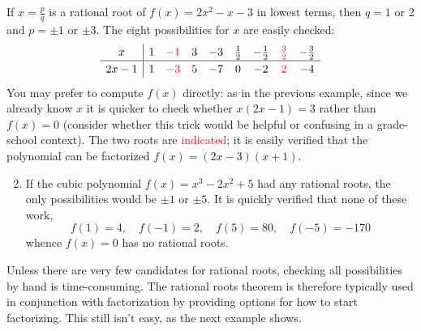 \begin{examples}{}{}
	\exstart If $x=\frac pq$ is a rational root of $f(x)=2x^2-x-3$ in lowest terms, then $q=1$ or 2 and $p=\pm 1$ or $\pm 3$. The eight possibilities for $x$ are easily checked:
	\[
		\def\arraystretch{1.2}
		\begin{array}{c|cccccccc}
			x&1&\textcolor{red}{-1}&3&-3&\frac 12&-\frac 12&\textcolor{red}{\frac 32}&-\frac 32\\\hline
			2x-1&1&\textcolor{red}{-3}&5&-7&0&-2&\textcolor{red}{2}&-4
		\end{array}
	\]
	You may prefer to compute $f(x)$ directly: as in the previous example, since we already know $x$ it is quicker to check whether $x(2x-1)=3$ rather than $f(x)=0$ (consider whether this trick would be helpful or confusing in a grade-school context). The two roots are \textcolor{red}{indicated}; it is easily verified that the polynomial can be factorized $f(x)=(2x-3)(x+1)$.
	\begin{enumerate}\setcounter{enumi}{1}
	  \item If the cubic polynomial $f(x)=x^3-2x^2+5$ had any rational roots, the only possibilities would be $\pm 1$ or $\pm 5$. It is quickly verified that none of these work,
	  \[
	  	f(1)=4,\quad f(-1)=2,\quad f(5)=80,\quad f(-5)=-170
	  \]
	  whence $f(x)=0$ has no rational roots.
	\end{enumerate}
\end{examples}

Unless there are very few candidates for rational roots, checking all possibilities by hand is time-consuming. The rational roots theorem is therefore typically used in conjunction with factorization by providing options for how to start factorizing. This still isn't easy, as the next example shows.


\goodbreak


